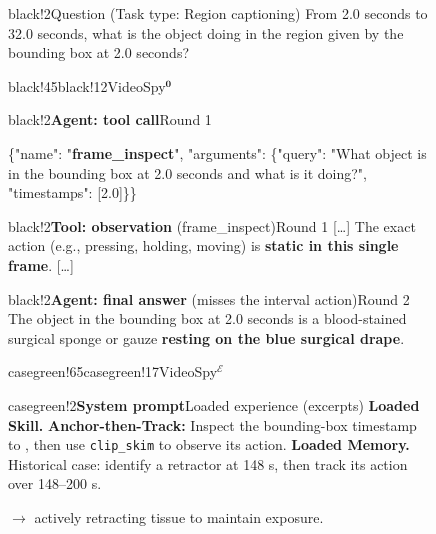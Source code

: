 \documentclass{article} %
\newcommand{\TraceFont}{\fontsize{8}{9.5}\selectfont}
\begin{document}
\begin{figure}[!t]
{\begin{minipage}{\linewidth}
\begin{MessageBox}[case compact,case heading,colbacktitle=black!7,top=0pt,bottom=0pt,before skip=1pt,after skip=2pt]{black!2}{Question {\mdseries (Task type: Region captioning)}}
From 2.0 seconds to 32.0 seconds, what is the object doing in the region given by the bounding box at 2.0 seconds?
\end{MessageBox}
\begin{ExecutionBox}[case compact,case heading,colback=casegray]{black!45}{black!12}{VideoSpy$^{\mathbf{0}}$}
\raggedright
\begin{MessageBox}{black!2}{\textbf{Agent: tool call}\hfill Round 1}
{\ttfamily\fontsize{6.4}{7.6}\selectfont
\{"name": "\textbf{frame\_inspect}", "arguments": \{"query": "What object is in the bounding box at 2.0 seconds and what is it doing?", "timestamps": [2.0]\}\}\par}
\end{MessageBox}
\begin{MessageBox}{black!2}{\textbf{Tool: observation} (frame\_inspect)\hfill Round 1}
[\ldots] The exact action (e.g., pressing, holding, moving) is \textbf{static in this single frame}. [\ldots]
\end{MessageBox}
\begin{MessageBox}{black!2}{\textbf{Agent: final answer} (\textcolor{changeaccent}{misses the interval action})\hfill Round 2}
The object in the bounding box at 2.0 seconds is a blood-stained surgical sponge or gauze \textcolor{changeaccent}{\textbf{resting on the blue surgical drape}}.
\end{MessageBox}
\end{ExecutionBox}
\begin{ExecutionBox}[case compact,case heading,colback=casepalegreen,coltitle=casegreen]{casegreen!65}{casegreen!17}{VideoSpy$^{\mathcal{E}}$}
\raggedright
\begin{MessageBox}[case compact,case evolved message,segmentation style={draw=casegreen!65,line width=0.35pt,dash pattern=on 2pt off 2pt},middle=1.5pt,lower separated=true,fontlower=\sffamily\TraceFont,before lower={\setlength{\parskip}{0pt}\raggedright}]{casegreen!2}{\textbf{System prompt}\hfill Loaded experience (excerpts)}
\textbf{Loaded Skill.} \textbf{Anchor-then-Track:} Inspect the bounding-box timestamp to , then use \texttt{clip\_skim}  to observe its action.
\tcblower
\textbf{Loaded Memory.} Historical case: identify a retractor at 148 s, then track its action over 148--200 s.\par
{} $\rightarrow$ actively retracting tissue to maintain exposure.

\end{MessageBox}
\end{ExecutionBox}
\end{minipage}}
\end{figure}
\end{document}
